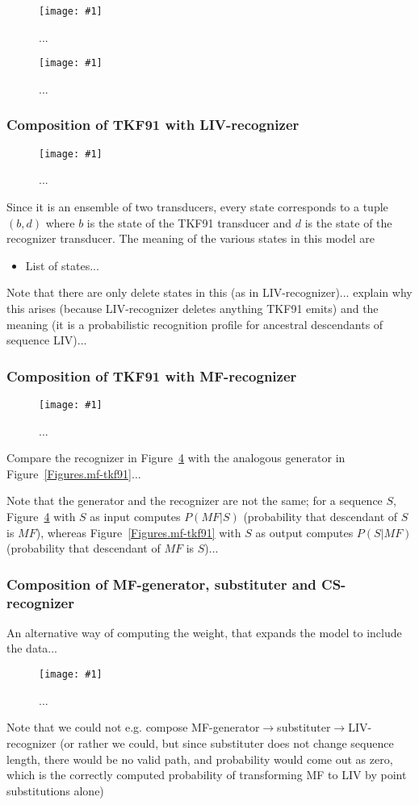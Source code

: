 \documentclass{article}
\newcommand{\figref}[1]{Figure~\ref{Figures.#1}}
\newcommand{\figlabel}[1]{\label{Figures.#1}}
\newcommand{\easyfig}[4]{
\begin{figure}
\texttt{[image: \#1]}
\caption{ \figlabel{#3} #4}
\end{figure}}
\newcommand{\pdffig}[2]{\easyfig{#1-fig.pdf}{}{#1}{#2}}
\newcommand{\tallpdffig}[2]{\easyfig{#1-fig.pdf}{height=\textheight}{#1}{#2}}
\begin{document}
\pdffig{substituter-mf}{...}

\pdffig{substituter-cs}{...}

\subsubsection{Composition of TKF91 with LIV-recognizer}

\tallpdffig{tkf91-liv}{...}

Since it is an ensemble of two transducers, every state corresponds to a tuple $(b,d)$
where
$b$ is the state of the TKF91 transducer and
$d$ is the state of the recognizer transducer.
The meaning of the various states in this model are
\begin{itemize}
\item List of states...
\end{itemize}

Note that there are only delete states in this (as in LIV-recognizer)...
explain why this arises (because LIV-recognizer deletes anything TKF91 emits)
and the meaning (it is a probabilistic recognition profile for ancestral descendants of sequence LIV)...

\subsubsection{Composition of TKF91 with MF-recognizer}

\tallpdffig{tkf91-mf}{...}

Compare the recognizer in \figref{tkf91-mf}
with the analogous generator in \figref{mf-tkf91}...

Note that the generator and the recognizer are not the same;
for a sequence $S$,
\figref{tkf91-mf} with $S$ as input computes $P(MF|S)$
(probability that descendant of $S$ is $MF$), 
whereas \figref{mf-tkf91} with $S$ as output computes $P(S|MF)$
(probability that descendant of $MF$ is $S$)...

\subsubsection{Composition of MF-generator, substituter and CS-recognizer}

An alternative way of computing the weight, that expands the model to include the data...
\pdffig{mf-substituter-cs}{...}

Note that we could not e.g. compose MF-generator$\to$substituter$\to$LIV-recognizer
(or rather we could, but since substituter does not change sequence length,
there would be no valid path, and probability would come out as zero,
which is the correctly computed probability of transforming MF to LIV by point substitutions alone)
\end{document}
